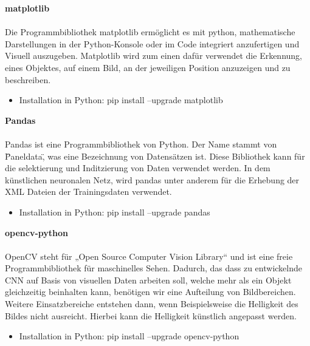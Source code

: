 \documentclass[a4paper,12pt,oneside]{article}
\begin{document}
\textbf{matplotlib}\\\\
Die Programmbibliothek matplotlib ermöglicht es mit python, mathematische Darstellungen in der Python-Konsole oder im Code integriert anzufertigen und Visuell auszugeben.
Matplotlib wird zum einen dafür verwendet die Erkennung, eines Objektes, auf einem Bild, an der jeweiligen Position anzuzeigen und zu beschreiben.

  \begin{itemize}
\item Installation in Python: pip install --upgrade matplotlib
  \end{itemize}
  
\textbf{Pandas}\\\\
Pandas ist eine Programmbibliothek von Python. Der Name stammt von \"Paneldata\", was eine Bezeichnung von Datensätzen ist. Diese Bibliothek kann für die selektierung und Inditzierung von Daten verwendet werden. In dem künstlichen neuronalen Netz, wird pandas unter anderem für die Erhebung der XML Dateien der Trainingsdaten verwendet.

  \begin{itemize}
\item Installation in Python: pip install --upgrade pandas
  \end{itemize}
  
\textbf{opencv-python}\\\\
OpenCV steht für „Open Source Computer Vision Library“ und ist eine freie Programmbibliothek für maschinelles Sehen. Dadurch, das dass zu entwickelnde CNN auf Basis von visuellen Daten arbeiten soll, welche mehr als ein Objekt gleichzeitig beinhalten kann, benötigen wir eine Aufteilung von Bildbereichen. Weitere Einsatzbereiche entstehen dann, wenn Beispielsweise die Helligkeit des Bildes nicht ausreicht. Hierbei kann die Helligkeit künstlich angepasst werden.

  \begin{itemize}
\item Installation in Python: pip install --upgrade opencv-python
  \end{itemize}
  
\end{document}
